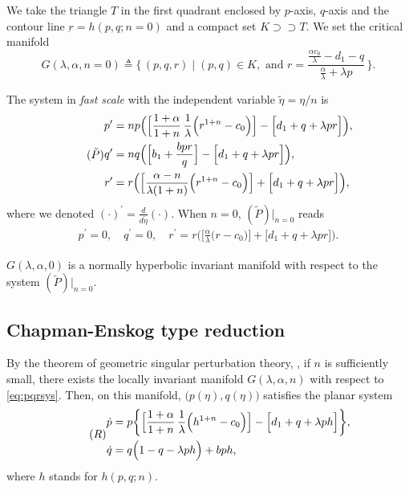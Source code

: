 \documentclass[graybox]{svmult}
\def\dpp{\dot{p}}
\def\dqq{\dot{q}}
\begin{document}
 
We take the triangle $T$ in the first quadrant enclosed by $p$-axis, $q$-axis and the contour line $\underbar{r} =  h(p,q;n=0)$ and a compact set $K\supset\supset T$. We set the critical manifold 
\begin{equation}
 G(\lambda,\alpha,n=0) \triangleq \Big\{\, (p,q,r) \;|\; (p,q) \in K, \text{ and } r=\frac{ \frac{\alpha c_0}{\lambda} - d_1 -q }{ \frac{\alpha}{\lambda} + \lambda p} \,\Big\}.
\end{equation}

The system in {\it fast scale} with the independent variable $\tilde{\eta} = \eta/n$ is
\begin{equation}\label{eq:pqr_fast} \tag*{($\tilde{P}$)}
\begin{aligned}
 p^\prime &=np\Big( \Big[\frac{1+\alpha}{1+n}\,\frac{1}{\lambda }\Big(r^{1+n}-c_0\Big)\Big] -\Big[d_1 + q + \lambda pr\Big]\Big), \\
 q^\prime &=nq\Big(\Big[b_1 +\frac{bpr}{q}\Big] -\Big[d_1 + q + \lambda pr\Big]\Big), \\
 r^\prime &=r\Big( \Big[\frac{\alpha-n}{\lambda(1+n)}\Big(r^{1+n}-c_0\Big)\Big]+\Big[d_1 + q + \lambda pr\Big]\Big),
\end{aligned}
\end{equation}
where we denoted $\displaystyle(\cdot)^\prime = \frac{d}{d\tilde{\eta}}(\cdot)$. When $n=0$, $(\tilde{P})|_{n=0}$ reads
\begin{align*}
 p^\prime =0, \quad q^\prime =0, \quad r^\prime=r\Big( \Big[\frac{\alpha}{\lambda}\Big(r-c_0\Big)\Big]+\Big[d_1 + q + \lambda pr\Big]\Big). %
\end{align*}
\begin{lemma} \label{lem:normal_hyper}
 $G(\lambda,\alpha,0)$ is a normally hyperbolic invariant manifold with respect to the system $(\tilde{P})|_{n=0}$.
\end{lemma}

\subsection{Chapman-Enskog type reduction}
By the theorem of geometric singular perturbation theory, \cite{fenichel_geometric_1979, KUEHN_2015}, if $n$ is sufficiently small, there exists  the locally invariant manifold $G(\lambda,\alpha,n)$ with respect to \eqref{eq:pqrsys}. Then, on this manifold, $\big(p(\eta),q(\eta)\big)$ satisfies the planar system
\begin{equation} \tag*{(${R}$)} \label{eq:reduced}
\begin{aligned}
 {\dpp}&=p\bigg\{\Big[\frac{1+\alpha}{1+n}\,\frac{1}{\lambda }\Big(h^{1+n}-c_0\Big)\Big] -\Big[d_1 + q + \lambda ph\Big]\bigg\},\\
 {\dqq}&=q\Big(1-q-\lambda p h\Big) + bph,\\
\end{aligned}
\end{equation}
where $h$ stands for $h(p,q;n)$.
\end{document}
